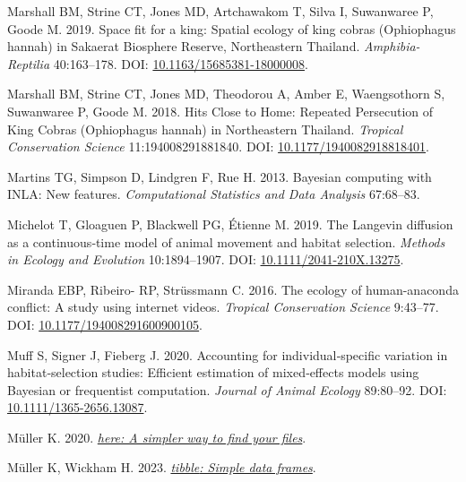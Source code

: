 \documentclass[10pt,a4paper]{article}
\newlength{\cslhangindent}
\newenvironment{CSLReferences}[2] %
 {\begin{list}{}{%
  \setlength{\itemindent}{0pt}
  \setlength{\leftmargin}{0pt}
  \setlength{\parsep}{0pt}
  \ifodd #1
   \setlength{\leftmargin}{\cslhangindent}
   \setlength{\itemindent}{-1\cslhangindent}
  \fi
  \setlength{\itemsep}{#2\baselineskip}}}
 {\end{list}}
\begin{document}
\begin{CSLReferences}{1}{0}
Marshall BM, Strine CT, Jones MD, Artchawakom T, Silva I, Suwanwaree P, Goode M. 2019. Space fit for a king: Spatial ecology of king cobras ({Ophiophagus} hannah) in {Sakaerat} {Biosphere} {Reserve}, {Northeastern} {Thailand}. \emph{Amphibia-Reptilia} 40:163--178. DOI: \href{https://doi.org/10.1163/15685381-18000008}{10.1163/15685381-18000008}.

Marshall BM, Strine CT, Jones MD, Theodorou A, Amber E, Waengsothorn S, Suwanwaree P, Goode M. 2018. Hits {Close} to {Home}: {Repeated} {Persecution} of {King} {Cobras} ({Ophiophagus} hannah) in {Northeastern} {Thailand}. \emph{Tropical Conservation Science} 11:194008291881840. DOI: \href{https://doi.org/10.1177/1940082918818401}{10.1177/1940082918818401}.

Martins TG, Simpson D, Lindgren F, Rue H. 2013. Bayesian computing with {INLA}: {N}ew features. \emph{Computational Statistics and Data Analysis} 67:68--83.

Michelot T, Gloaguen P, Blackwell PG, Étienne M. 2019. The {Langevin} diffusion as a continuous‐time model of animal movement and habitat selection. \emph{Methods in Ecology and Evolution} 10:1894--1907. DOI: \href{https://doi.org/10.1111/2041-210X.13275}{10.1111/2041-210X.13275}.

Miranda EBP, Ribeiro- RP, Strüssmann C. 2016. The ecology of human-anaconda conflict: A study using internet videos. \emph{Tropical Conservation Science} 9:43--77. DOI: \href{https://doi.org/10.1177/194008291600900105}{10.1177/194008291600900105}.

Muff S, Signer J, Fieberg J. 2020. Accounting for individual‐specific variation in habitat‐selection studies: {Efficient} estimation of mixed‐effects models using {Bayesian} or frequentist computation. \emph{Journal of Animal Ecology} 89:80--92. DOI: \href{https://doi.org/10.1111/1365-2656.13087}{10.1111/1365-2656.13087}.

Müller K. 2020. \emph{\href{https://CRAN.R-project.org/package=here}{{here}: A simpler way to find your files}}.

Müller K, Wickham H. 2023. \emph{\href{https://CRAN.R-project.org/package=tibble}{{tibble}: Simple data frames}}.


\end{CSLReferences}
\end{document}
